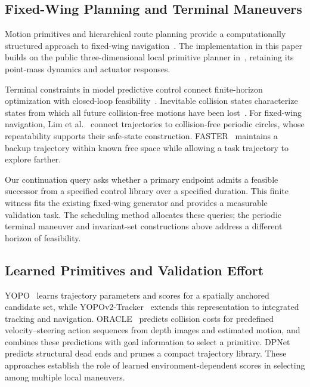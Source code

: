 \documentclass[journal]{IEEEtran}
\begin{document}
\subsection{Fixed-Wing Planning and Terminal Maneuvers}
Motion primitives and hierarchical route planning provide a computationally structured approach to fixed-wing navigation~\cite{tan2022twophase,tan2026twophase}. The implementation in this paper builds on the public three-dimensional local primitive planner in~\cite{hkpolyu2026code}, retaining its point-mass dynamics and actuator responses.

Terminal constraints in model predictive control connect finite-horizon optimization with closed-loop feasibility~\cite{mayne2000mpc}. Inevitable collision states characterize states from which all future collision-free motions have been lost~\cite{fraichard2004ics}. For fixed-wing navigation, Lim et al.~\cite{lim2024safe} connect trajectories to collision-free periodic circles, whose repeatability supports their safe-state construction. FASTER~\cite{tordesillas2022faster} maintains a backup trajectory within known free space while allowing a task trajectory to explore farther.

Our continuation query asks whether a primary endpoint admits a feasible successor from a specified control library over a specified duration. This finite witness fits the existing fixed-wing generator and provides a measurable validation task. The scheduling method allocates these queries; the periodic terminal maneuver and invariant-set constructions above address a different horizon of feasibility.

\subsection{Learned Primitives and Validation Effort}
YOPO~\cite{lu2024yopo} learns trajectory parameters and scores for a spatially anchored candidate set, while YOPOv2-Tracker~\cite{lu2026yopov2} extends this representation to integrated tracking and navigation. ORACLE~\cite{nguyen2022oracle} predicts collision costs for predefined velocity--steering action sequences from depth images and estimated motion, and combines these predictions with goal information to select a primitive. DPNet~\cite{zhang2026dpnet} predicts structural dead ends and prunes a compact trajectory library. These approaches establish the role of learned environment-dependent scores in selecting among multiple local maneuvers.
\end{document}

